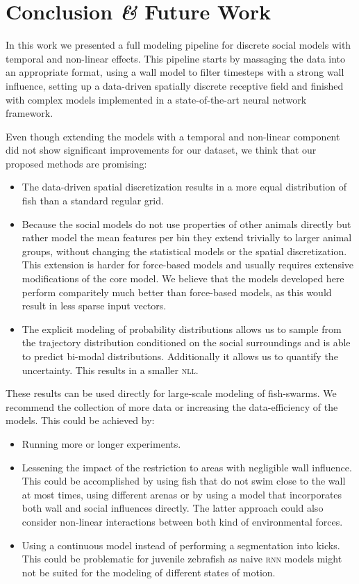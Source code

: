 \documentclass[nobib, a4paper]{tufte-handout}
\begin{document}
\section{Conclusion \textit{\&} Future Work}
In this work we presented a full modeling pipeline for discrete social models with temporal and non-linear effects.
This pipeline starts by massaging the data into an appropriate format, using a wall model to filter timesteps with a strong wall influence, setting up a data-driven spatially discrete receptive field and finished with complex models implemented in a state-of-the-art neural network framework. 

Even though extending the models with a temporal and non-linear component did not show significant improvements for our dataset, we think that our proposed methods are promising:
\begin{itemize}
\item The data-driven spatial discretization results in a more equal distribution of fish than a standard regular grid.
\item Because the social models do not use properties of other animals directly but rather model the mean features per bin they extend trivially to larger animal groups, without changing the statistical models or the spatial discretization.
  This extension is harder for force-based models and usually requires extensive modifications of the core model.
  We believe that the models developed here perform comparitely much better than force-based models, as this would result in less sparse input vectors.
\item The explicit modeling of probability distributions allows us to sample from the trajectory distribution conditioned on the social surroundings and is able to predict bi-modal distributions.
  Additionally it allows us to quantify the uncertainty.
  This results in a smaller \textsc{nll}.
\end{itemize}
These results can be used directly for large-scale modeling of fish-swarms.
We recommend the collection of more data or increasing the data-efficiency of the models.
This could be achieved by:
\begin{itemize}
\item Running more or longer experiments.
\item Lessening the impact of the restriction to areas with negligible wall influence.
  This could be accomplished by using fish that do not swim close to the wall at most times, using different arenas or by using a model that incorporates both wall and social influences directly.
  The latter approach could also consider non-linear interactions between both kind of environmental forces.
\item Using a continuous model instead of performing a segmentation into kicks.
  This could be problematic for juvenile zebrafish as naive \textsc{rnn} models might not be suited for the modeling of different states of motion.
\end{itemize}

\printbibliography
\end{document}
